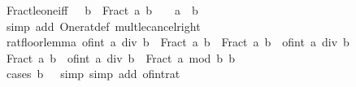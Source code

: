 \begin{isabellebody}
\endisatagproof
{\isafoldproof}%
%
\isadelimproof
\isanewline
%
\endisadelimproof
\isanewline
{}\isamarkupfalse%
\ Fract{\isacharunderscore}{\kern0pt}le{\isacharunderscore}{\kern0pt}one{\isacharunderscore}{\kern0pt}iff{\isacharcolon}{\kern0pt}\ {\isachardoublequoteopen}{}\ {\isacharless}{\kern0pt}\ b\ {\isasymLongrightarrow}\ Fract\ a\ b\ {\isasymle}\ {}\ {\isasymlongleftrightarrow}\ a\ {\isasymle}\ b{\isachardoublequoteclose}\isanewline
%
\isadelimproof
\ \ %
\endisadelimproof
%
\isatagproof
{}\isamarkupfalse%
\ {\isacharparenleft}{\kern0pt}simp\ add{\isacharcolon}{\kern0pt}\ One{\isacharunderscore}{\kern0pt}rat{\isacharunderscore}{\kern0pt}def\ mult{\isacharunderscore}{\kern0pt}le{\isacharunderscore}{\kern0pt}cancel{\isacharunderscore}{\kern0pt}right{\isacharparenright}{\kern0pt}%
\endisatagproof
{\isafoldproof}%
%
\isadelimproof
%
\endisadelimproof
%
\isadelimdocument
%
\endisadelimdocument
%
\isatagdocument
%
\isamarkuptrue%
%
\endisatagdocument
{\isafolddocument}%
%
\isadelimdocument
%
\endisadelimdocument
{}\isamarkupfalse%
\ rat{\isacharunderscore}{\kern0pt}floor{\isacharunderscore}{\kern0pt}lemma{\isacharcolon}{\kern0pt}\ {\isachardoublequoteopen}of{\isacharunderscore}{\kern0pt}int\ {\isacharparenleft}{\kern0pt}a\ div\ b{\isacharparenright}{\kern0pt}\ {\isasymle}\ Fract\ a\ b\ {\isasymand}\ Fract\ a\ b\ {\isacharless}{\kern0pt}\ of{\isacharunderscore}{\kern0pt}int\ {\isacharparenleft}{\kern0pt}a\ div\ b\ {\isacharplus}{\kern0pt}\ {}{\isacharparenright}{\kern0pt}{\isachardoublequoteclose}\isanewline
%
\isadelimproof
%
\endisadelimproof
%
\isatagproof
{}\isamarkupfalse%
\ {\isacharminus}{\kern0pt}\isanewline
\ \ \isamarkupfalse%
\ {\isachardoublequoteopen}Fract\ a\ b\ {\isacharequal}{\kern0pt}\ of{\isacharunderscore}{\kern0pt}int\ {\isacharparenleft}{\kern0pt}a\ div\ b{\isacharparenright}{\kern0pt}\ {\isacharplus}{\kern0pt}\ Fract\ {\isacharparenleft}{\kern0pt}a\ mod\ b{\isacharparenright}{\kern0pt}\ b{\isachardoublequoteclose}\isanewline
\ \ \ \ \isamarkupfalse%
\ {\isacharparenleft}{\kern0pt}cases\ {\isachardoublequoteopen}b\ {\isacharequal}{\kern0pt}\ {}{\isachardoublequoteclose}{\isacharparenright}{\kern0pt}\ {\isacharparenleft}{\kern0pt}simp{\isacharcomma}{\kern0pt}\ simp\ add{\isacharcolon}{\kern0pt}\ of{\isacharunderscore}{\kern0pt}int{\isacharunderscore}{\kern0pt}rat{\isacharparenright}{\kern0pt}\isanewline
\ \ \isamarkupfalse%

\end{isabellebody}
